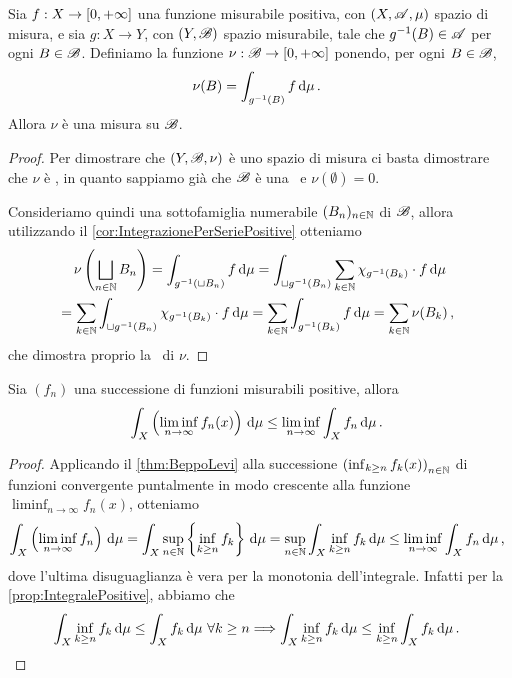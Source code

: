 \begin{lemma}\label{lemma:MisuraIntegrale}
	Sia $f:X\to[0,+\infty]$ una funzione misurabile positiva, con $(X,\mathscr A,\mu)$ spazio di misura, e sia $g:X\to Y$, con $(Y,\mathscr B)$ spazio misurabile, tale che $g^{-1}(B)\in\mathscr A$ per ogni $B\in\mathscr B$. Definiamo la funzione $\nu:\mathscr B\to[0,+\infty]$ ponendo, per ogni $B\in\mathscr B$,
	\begin{equation*}
		\nu(B)=\int_{g^{-1}(B)}f\,\mathrm d\mu\, \text{. }
	\end{equation*}
	Allora $\nu$ è una misura su $\mathscr B$.
\end{lemma}
\begin{proof}
	Per dimostrare che $(Y,\mathscr B,\nu)$ è uno spazio di misura ci basta dimostrare che $\nu$ è \sigadd, in quanto sappiamo già che $\mathscr B$ è una \sigalg\ e $\nu(\emptyset)=0$.
	
	Consideriamo quindi una sottofamiglia numerabile $(B_n)_{n\in\mathbb N}$ di $\mathscr B$, allora utilizzando il \cref{cor:IntegrazionePerSeriePositive} otteniamo
	\begin{multline*}
		\nu\left(\bigsqcup_{n\in\mathbb N}B_n\right)=\int_{g^{-1}(\sqcup B_n)}f\,\mathrm d\mu=\int_{\sqcup g^{-1}(B_n)}\sum_{k\in\mathbb N}\chi_{g^{-1}(B_k)}\cdot f\,\mathrm d\mu\\
		=\sum_{k\in\mathbb N}\int_{\sqcup g^{-1}(B_n)}\chi_{g^{-1}(B_k)}\cdot f\,\mathrm d\mu=
		\sum_{k\in\mathbb N}\int_{g^{-1}(B_k)}f\,\mathrm d\mu=\sum_{k\in\mathbb N}\nu(B_k)\, \text{, }
	\end{multline*}
	che dimostra proprio la \sigadd\ di $\nu$.
\end{proof}

\begin{lemma}[Fatou] \label{lemma:Fatou}
	Sia $(f_n)$ una successione di funzioni misurabili positive, allora 
	\begin{equation*}
		\int_X\left(\liminf_{n\to\infty}f_n(x)\right)\,\mathrm d\mu\le \liminf_{n\to\infty}\int_Xf_n\,\mathrm d\mu\, \text{. }
	\end{equation*}
\end{lemma}

\begin{proof}
	Applicando il \cref{thm:BeppoLevi} alla successione $\left(\inf_{k\ge n}f_k(x)\right)_{n\in\mathbb N}$ di funzioni convergente puntalmente in modo crescente alla funzione $\liminf_{n\to\infty}f_n(x)$, otteniamo
	\begin{equation*}
		\int_X\left(\liminf_{n\to\infty}f_n\right)\,\mathrm d\mu=\int_X \sup_{n\in\mathbb N}\left\{\inf_{k\ge n}f_k\right\}\,\mathrm d\mu=\sup_{n\in\mathbb N}\int_X \inf_{k\ge n}f_k\,\mathrm d\mu\le \liminf_{n\to\infty}\int_Xf_n\,\mathrm d\mu\, \text{, }
	\end{equation*}
	dove l'ultima disuguaglianza è vera per la monotonia dell'integrale. Infatti per la \cref{prop:IntegralePositive}, abbiamo che
	\begin{equation*}
		\int_X \inf_{k\ge n}f_k\,\mathrm d\mu\le \int_Xf_k\,\mathrm d\mu \ \forall k\ge n \Longrightarrow \int_X \inf_{k\ge n}f_k\,\mathrm d\mu\le \inf_{k\ge n}\int_Xf_k\,\mathrm d\mu\, \text{. }
	\end{equation*}
\end{proof}

